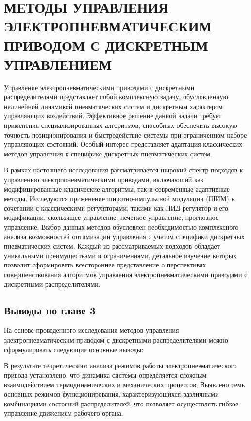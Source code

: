 \chapter{МЕТОДЫ УПРАВЛЕНИЯ ЭЛЕКТРОПНЕВМАТИЧЕСКИМ ПРИВОДОМ С ДИСКРЕТНЫМ УПРАВЛЕНИЕМ}\label{ch:ch3}
Управление электропневматическими приводами с дискретными распределителями представляет
собой комплексную задачу, обусловленную нелинейной динамикой пневматических систем и
дискретным характером управляющих воздействий. Эффективное решение данной задачи требует
применения специализированных алгоритмов, способных обеспечить высокую точность позиционирования и
быстродействие системы при ограниченном наборе управляющих состояний. Особый интерес представляет адаптация
классических методов управления к специфике дискретных пневматических систем.

В рамках настоящего исследования рассматривается широкий спектр подходов к управлению электропневматическими
приводами, включающий как модифицированные класические алгоритмы, так и современные адаптивные методы.
Исследуются применение широтно-импульсной модуляции (ШИМ)
в сочетании с классическими регуляторами, такими как ПИД-регулятор и его модификации,
скользящее управление, нечеткое управление, прогнозное управление.
Выбор данных методов обусловлен необходимостью комплексного анализа возможностей оптимизации управления
с учетом специфики дискретных пневматических систем. Каждый из рассматриваемых подходов обладает
уникальными преимуществами и ограничениями, детальное изучение которых позволит сформировать
всестороннее представление о перспективах совершенствования алгоритмов управления
электропневматическими приводами с дискретными распределителями.


% 





\section{Выводы по главе 3}
На основе проведенного исследования методов управления электропневматическим приводом с дискретными распределителями можно сформулировать следующие основные выводы:

В результате теоретического анализа режимов работы электропневматического привода установлено, 
что динамика системы определяется сложным взаимодействием термодинамических и
механических процессов. Выявлено семь основных режимов функционирования, характеризующихся
различными комбинациями состояний распределителей, что позволяет осуществлять
гибкое управление движением рабочего органа.

